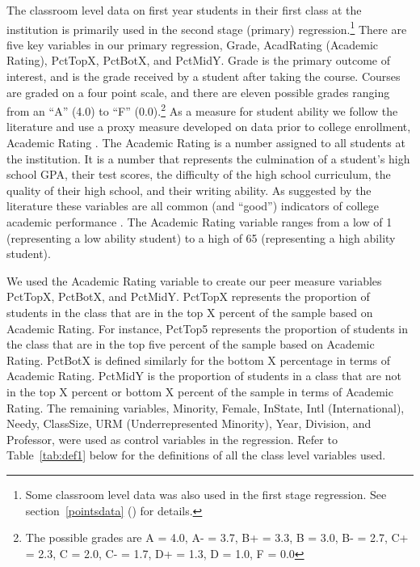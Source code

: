 \documentclass[12pt,a4paper,english,fleqn]{article}
\newcommand{\sectlabel}[1]{section~\ref{#1} (\nameref{#1})}
\newcommand{\tablelabel}[1]{Table~\ref{#1}}
\begin{document}
The classroom level data on first year students in their first class at the institution is primarily used in the second stage (primary) regression.\footnote{Some classroom level data was also used in the first stage regression. See \sectlabel{pointsdata} for details.}
There are five key variables in our primary regression, Grade, AcadRating (Academic Rating), PctTopX, PctBotX, and PctMidY. 
Grade is the primary outcome of interest, and is the grade received by a student after taking the course. 
Courses are graded on a four point scale, and there are eleven possible grades ranging from an ``A'' (4.0) to ``F'' (0.0).\footnote{The possible grades are A = 4.0, A- = 3.7, B+ = 3.3, B = 3.0, B- = 2.7, C+ = 2.3, C = 2.0, C- = 1.7, D+ = 1.3, D = 1.0, F = 0.0} 
As a measure for student ability we follow the literature and use a proxy measure developed on data prior to college enrollment, Academic Rating \citep{griffith2014peer}. 
The Academic Rating is a number assigned to all students at the institution. 
It is a number that represents the culmination of a student's high school GPA, their test scores, the difficulty of the high school curriculum, the quality of their high school, and their writing ability. 
As suggested by the literature these variables are all common (and ``good'') indicators of college academic performance \citep{betts2003determinants,dooley2012persistence}.
The Academic Rating variable ranges from a low of 1 (representing a low ability student) to a high of 65 (representing a high ability student).

We used the Academic Rating variable to create our peer measure variables PctTopX, PctBotX, and PctMidY. 
PctTopX represents the proportion of students in the class that are in the top X percent of the sample based on Academic Rating. 
For instance, PctTop5 represents the proportion of students in the class that are in the top five percent of the sample based on Academic Rating.
PctBotX is defined similarly for the bottom X percentage in terms of Academic Rating. 
PctMidY is the proportion of students in a class that are not in the top X percent or bottom X percent of the sample in terms of Academic Rating. 
The remaining variables, Minority, Female, InState, Intl (International), Needy, ClassSize, URM (Underrepresented Minority), Year, Division, and Professor, were used as control variables in the regression.
Refer to \tablelabel{tab:def1} below for the definitions of all the class level variables used. 

\clearpage{}
\end{document}
